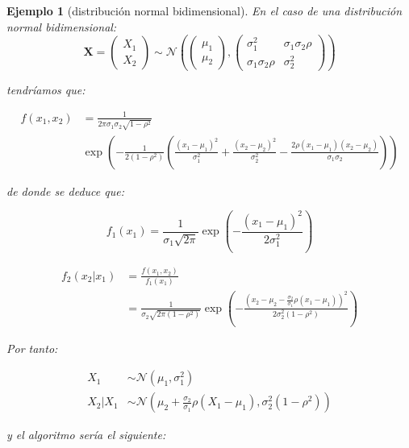 \documentclass[
  spanish,
  10pt,
]{book}
\renewcommand{\mathbf}[1]{\symbf{#1}}
\theoremstyle{break}
\newtheorem{example}{Ejemplo}[chapter]
\theoremstyle{nonumberplain}
\begin{document}
\begin{example}[distribución normal bidimensional]

En el caso de una distribución normal bidimensional:
\[\mathbf{X} = \begin{pmatrix}
 X_1 \\
 X_2
\end{pmatrix}  
\sim \mathcal{N} \left( \begin{pmatrix}
 \mu_1 \\
 \mu_2
\end{pmatrix} , 
\begin{pmatrix}
 \sigma^2_1 &  \sigma_1 \sigma_2 \rho \\
 \sigma_1 \sigma_2 \rho &  \sigma^2_2
\end{pmatrix} \right)\]

tendríamos que:

\[\begin{aligned}
f(x_1,x_2) &= \frac{1}{2 \pi \sigma_1 \sigma_2 \sqrt{1-\rho^2}} \\
&\exp \left( -\frac{1}{2 (1-\rho^2)} \left( \frac{(x_1 - \mu_1)^2}{\sigma_1^2} + \frac{(x_2 - \mu_2)^2}{\sigma_2^2} - \frac{2 \rho (x_1 - \mu_1) (x_2 - \mu_2)}{ \sigma_1 \sigma_2} \right)
\right)
\end{aligned}\]

de donde se deduce \citep[ver e.g.][p.88]{cao2002} que:

\[f_1( x_1 ) = \frac{1}{\sigma_1\sqrt{2\pi}}
\exp\left( -\frac{(x_1 - \mu_1)^{2}}{2\sigma_1^{2}}\right)\]

\[\begin{aligned}
f_2\left( x_2|x_1\right)  &= \frac{f\left( x_1,x_2\right)  }{f_1\left( x_1\right)} \\ &= \frac{1}{\sigma_2\sqrt{2\pi (1-\rho^2)}}
\exp\left( -\frac{\left(x_2 - \mu_2 - \frac{\sigma_2}{\sigma_1}\rho( x_1 - \mu_1)\right)^{2}}{2\sigma_2^2 (1-\rho^2)}\right)
\end{aligned}\]

Por tanto:

\[\begin{aligned}
X_1 &\sim \mathcal{N}\left( \mu_1, \sigma_1^2 \right) \\
X_2 | X_1 &\sim \mathcal{N} \left( \mu_2 + \frac{\sigma_2}{\sigma_1}\rho( X_1 - \mu_1), \sigma_2^2 (1-\rho^2) \right)
\end{aligned}\]

y el algoritmo sería el siguiente:
\end{example}
\end{document}
